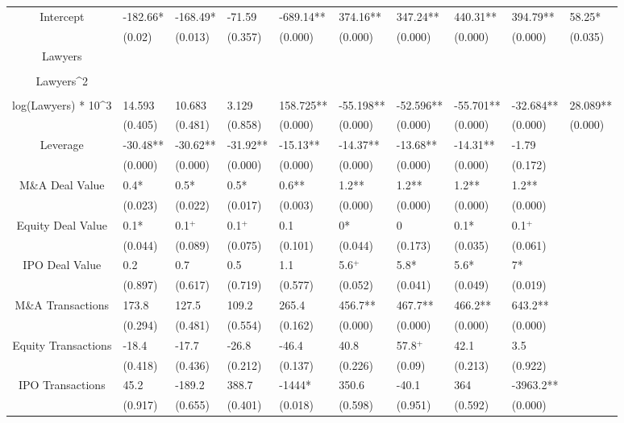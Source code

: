 \documentclass{article}
\begin{document}
\begin{table}[H]
\begin{tabular}{|clllllllll|}
Intercept & -182.66* & -168.49* & -71.59 & -689.14** & 374.16** & 347.24** & 440.31** & 394.79** & 58.25* \\
   & (0.02) & (0.013) & (0.357) & (0.000) & (0.000) & (0.000) & (0.000) & (0.000) & (0.035) \\
  Lawyers &  &  &  &  &  &  &  &  &  \\
   &  &  &  &  &  &  &  &  &  \\
  Lawyers^2 &  &  &  &  &  &  &  &  &  \\
   &  &  &  &  &  &  &  &  &  \\
  log(Lawyers) * 10^3 & 14.593 & 10.683 & 3.129 & 158.725** & -55.198** & -52.596** & -55.701** & -32.684** & 28.089** \\
   & (0.405) & (0.481) & (0.858) & (0.000) & (0.000) & (0.000) & (0.000) & (0.000) & (0.000) \\
  Leverage & -30.48** & -30.62** & -31.92** & -15.13** & -14.37** & -13.68** & -14.31** & -1.79 &  \\
   & (0.000) & (0.000) & (0.000) & (0.000) & (0.000) & (0.000) & (0.000) & (0.172) &  \\
  M\&A Deal Value & 0.4* & 0.5* & 0.5* & 0.6** & 1.2** & 1.2** & 1.2** & 1.2** &  \\
   & (0.023) & (0.022) & (0.017) & (0.003) & (0.000) & (0.000) & (0.000) & (0.000) &  \\
  Equity Deal Value & 0.1* & 0.1$^{+}$ & 0.1$^{+}$ & 0.1 & 0* & 0 & 0.1* & 0.1$^{+}$ &  \\
   & (0.044) & (0.089) & (0.075) & (0.101) & (0.044) & (0.173) & (0.035) & (0.061) &  \\
  IPO Deal Value & 0.2 & 0.7 & 0.5 & 1.1 & 5.6$^{+}$ & 5.8* & 5.6* & 7* &  \\
   & (0.897) & (0.617) & (0.719) & (0.577) & (0.052) & (0.041) & (0.049) & (0.019) &  \\
  M\&A Transactions & 173.8 & 127.5 & 109.2 & 265.4 & 456.7** & 467.7** & 466.2** & 643.2** &  \\
   & (0.294) & (0.481) & (0.554) & (0.162) & (0.000) & (0.000) & (0.000) & (0.000) &  \\
  Equity Transactions & -18.4 & -17.7 & -26.8 & -46.4 & 40.8 & 57.8$^{+}$ & 42.1 & 3.5 &  \\
   & (0.418) & (0.436) & (0.212) & (0.137) & (0.226) & (0.09) & (0.213) & (0.922) &  \\
  IPO Transactions & 45.2 & -189.2 & 388.7 & -1444* & 350.6 & -40.1 & 364 & -3963.2** &  \\
   & (0.917) & (0.655) & (0.401) & (0.018) & (0.598) & (0.951) & (0.592) & (0.000) &  \\

\end{tabular}
\end{table}
\end{document}
